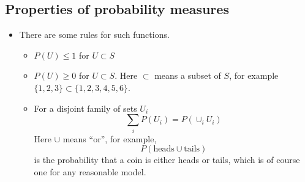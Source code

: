 \subsection{Properties of probability measures \cite[Ch 1. Sec. 1.3]{tabak}}
\begin{itemize}
\item There are some rules for such functions. 
\begin{itemize}
\item $P(U) \le 1$  for $U \subset S$
\item $P(U) \ge 0$ for $U \subset S$. Here $\subset$ means a subset of $S$, for example $\{1,2,3\} \subset \{1,2,3,4,5,6\}$. 
\item For a disjoint family of sets $U_i$
\begin{equation*}
 \sum_{i}P(U_i) = P\left(\cup_i U_i\right)
\end{equation*}
Here $\cup$ means ``or'', for example, 
\begin{equation*}
 P\left(\text{heads} \cup \text{tails} \right) 
 \end{equation*}
 is the probability that a coin is either heads or tails, which is of course one for any reasonable model. 
\end{itemize}




\end{itemize}
